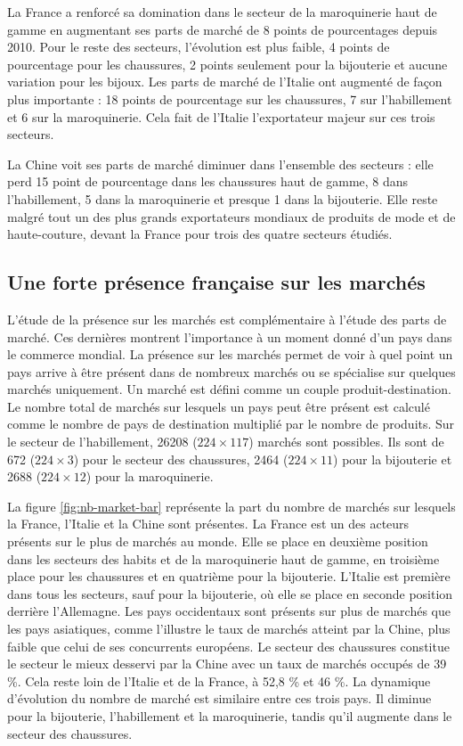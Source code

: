 \documentclass[french,10pt,a4paper]{article}
\begin{document}
La France a renforcé sa domination dans le secteur de la maroquinerie haut de gamme en augmentant ses parts de marché de 8 points de pourcentages depuis 2010. Pour le reste des secteurs, l'évolution est plus faible, 4 points de pourcentage pour les chaussures, 2 points seulement pour la bijouterie et aucune variation pour les bijoux. Les parts de marché de l'Italie ont augmenté de façon plus importante : 18 points de pourcentage sur les chaussures, 7 sur l'habillement et 6 sur la maroquinerie. Cela fait de l'Italie l'exportateur majeur sur ces trois secteurs.

La Chine voit ses parts de marché diminuer dans l'ensemble des secteurs : elle perd 15 point de pourcentage dans les chaussures haut de gamme, 8 dans l'habillement, 5 dans la maroquinerie et presque 1 dans la bijouterie. Elle reste malgré tout un des plus grands exportateurs mondiaux de produits de mode et de haute-couture, devant la France pour trois des quatre secteurs étudiés.

\subsection{Une forte présence française sur les marchés}
L'étude de la présence sur les marchés est complémentaire à l'étude des parts de marché. Ces dernières montrent l'importance à un moment donné d'un pays dans le commerce mondial. La présence sur les marchés permet de voir à quel point un pays arrive à être présent dans de nombreux marchés ou se spécialise sur quelques marchés uniquement. Un marché est défini comme un couple produit-destination. Le nombre total de marchés sur lesquels un pays peut être présent est calculé comme le nombre de pays de destination multiplié par le nombre de produits. Sur le secteur de l'habillement, 26208 ($224 \times 117$) marchés sont possibles. Ils sont de 672 ($224 \times 3$) pour le secteur des chaussures, 2464 ($224 \times 11$) pour la bijouterie et 2688 ($224 \times 12$) pour la maroquinerie.

\bigskip

La figure \ref{fig:nb-market-bar} représente la part du nombre de marchés sur lesquels la France, l'Italie et la Chine sont présentes. La France est un des acteurs présents sur le plus de marchés au monde. Elle se place en deuxième position dans les secteurs des habits et de la maroquinerie haut de gamme, en troisième place pour les chaussures et en quatrième pour la bijouterie. L'Italie est première dans tous les secteurs, sauf pour la bijouterie, où elle se place en seconde position derrière l'Allemagne. Les pays occidentaux sont présents sur plus de marchés que les pays asiatiques, comme l'illustre le taux de marchés atteint par la Chine, plus faible que celui de ses concurrents européens. Le secteur des chaussures constitue le secteur le mieux desservi par la Chine avec un taux de marchés occupés de 39 \%. Cela reste loin de l'Italie et de la France, à 52,8 \% et 46 \%. La dynamique d'évolution du nombre de marché est similaire entre ces trois pays. Il diminue pour la bijouterie, l'habillement et la maroquinerie, tandis qu'il augmente dans le secteur des chaussures.
\end{document}
